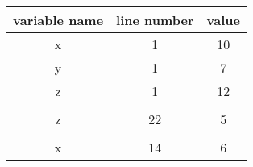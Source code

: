 \begin{latin}
	\begin{center}
		\begin{tabular}{|c|c|c|}
			\hline
			variable name & line number & value\\
			\hline
			x & 1 & 10\\
			\hline
			y & 1 & 7\\
			\hline
			z & 1 & 12\\
			\hline
			\rowcolor{black} \multicolumn{3}{|c|}{}\\
			\hline
			z & 22 & 5\\
			\hline
			\rowcolor{black} \multicolumn{3}{|c|}{}\\
			\hline
			x & 14 & 6\\
			\hline
		\end{tabular}
	\end{center}
\end{latin}

